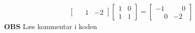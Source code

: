 \begin{eks}
\begin{align*}
\begin{bmatrix}
                \phantom{-}1 & -2
            \end{bmatrix}
            \begin{bmatrix}
                1 & 0\\
                1 & 1
            \end{bmatrix} 
            =
            \begin{bmatrix}
                -1 & \phantom{-}0\\
                \phantom{-}0 & -2
            \end{bmatrix}
    \end{align*}
    \textbf{OBS} Læs kommentar i koden
\end{eks}